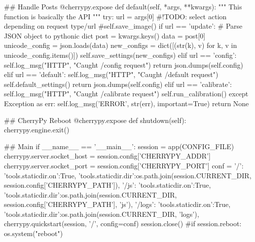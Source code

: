 \begin{python}
    ## Handle Posts
    @cherrypy.expose
    def default(self, *args, **kwargs):
        """ This function is basically the API """
        try:
            url = args[0] #!TODO: select action depending on request type/url
            #self.save_image()
            if url == 'update':       
                # Parse JSON object to pythonic dict 
                post = kwargs.keys()
                data = post[0]
                unicode_config = json.loads(data)
                new_configs = dict([(str(k), v) for k, v in unicode_config.items()])                
                self.save_settings(new_configs)
            elif url == 'config':
                self.log_msg("HTTP", "Caught /config request")
                return json.dumps(self.config)
            elif url == 'default':
                self.log_msg("HTTP", "Caught /default request")
                self.default_settings()
                return json.dumps(self.config)
            elif url == 'calibrate':
                self.log_msg("HTTP", "Caught /calibrate request")
                self.run_calibration()
        except Exception as err:
            self.log_msg('ERROR', str(err), important=True)
        return None

    ## CherryPy Reboot
    @cherrypy.expose
    def shutdown(self):
        cherrypy.engine.exit()

## Main
if __name__ == '__main__':
    session = app(CONFIG_FILE)
    cherrypy.server.socket_host = session.config['CHERRYPY_ADDR']
    cherrypy.server.socket_port = session.config['CHERRYPY_PORT']
    conf = {
        '/': {'tools.staticdir.on':True, 'tools.staticdir.dir':os.path.join(session.CURRENT_DIR, session.config['CHERRYPY_PATH'])},
        '/js': {'tools.staticdir.on':True, 'tools.staticdir.dir':os.path.join(session.CURRENT_DIR, session.config['CHERRYPY_PATH'], 'js')},
        '/logs': {'tools.staticdir.on':True, 'tools.staticdir.dir':os.path.join(session.CURRENT_DIR, 'logs')},
    }
    cherrypy.quickstart(session, '/', config=conf)
    session.close()
    #if session.reboot: os.system("reboot")
\end{python}